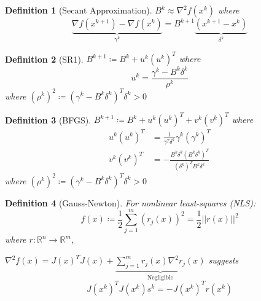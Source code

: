 \documentclass[a4paper]{article}
\newcommand{\R}{\mathbb{R}}
\newcommand{\norm}[1]{\lvert \lvert #1 \rvert \rvert}
\newtheorem*{definition*}{Definition}
\begin{document}
\begin{definition*}[Secant Approximation]
    $B^k \approx \nabla^2 f \left( x^k \right)$ where
    \begin{equation*}
        \underbrace{\nabla f \left( x^{k+1} \right) - \nabla f \left( x^k \right)}_{\gamma^k} = B^{k+1} \underbrace{\left( x^{k+1} - x^k \right)}_{\delta^k}
    \end{equation*}
\end{definition*}

\begin{definition*}[SR1]
    $B^{k+1} \coloneqq B^k + u^k \left( u^k \right)^T$ where
    \begin{equation*}
        u^k = \frac{\gamma^k - B^k \delta^k}{\rho^k}
    \end{equation*}
    where $\left( \rho^k \right)^2 \coloneqq \left( \gamma^k - B^k \delta^k \right)^T \delta^k > 0$
\end{definition*}

\begin{definition*}[BFGS]
    $B^{k+1} \coloneqq B^k + u^k \left( u^k \right)^T + v^k \left( v^k \right)^T$ where
    \begin{align*}
        u^k \left( u^k \right)^T &=  \frac{1}{\gamma^T \delta^k}\gamma^k \left( \gamma^k \right)^T \\
        v^k \left( v^k \right)^T &=  - \frac{B^k \delta^k \left( B^k \delta^k \right)^T}{\left( \delta^k \right)^T B^k \delta^k}
    \end{align*}
    where $\left( \rho^k \right)^2 \coloneqq \left( \gamma^k - B^k \delta^k \right)^T \delta^k > 0$
\end{definition*}

\begin{definition*}[Gauss-Newton]
    For nonlinear least-squares (NLS):
    \begin{equation*}
        f(x) \coloneqq \frac{1}{2} \sum_{j=1}^m \left( r_j (x) \right)^2 = \frac{1}{2} \norm{r(x)}^2
    \end{equation*}
    where $r:\R^n \rightarrow \R^m$,

    $\nabla^{2} f (x) = J(x)^T J(x) + \underbrace{\sum_{j=1}^m r_j (x) \nabla^{2} r_j (x)}_{\text{Negligible}}$ suggests
    \begin{equation*}
        J \left( x^k \right)^T J\left( x^k \right) s^k = -J\left( x^k \right)^T r\left( x^k \right)
    \end{equation*}
\end{definition*}
\end{document}
